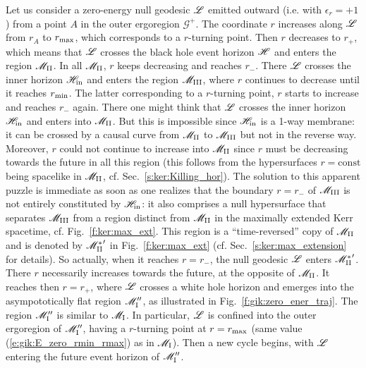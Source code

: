 Let us consider a zero-energy null geodesic $\mathscr{L}$ emitted outward (i.e.
with $\epsilon_r = +1$) from a point $A$ in the outer ergoregion $\mathscr{G}^+$.
The coordinate $r$ increases along $\mathscr{L}$ from $r_A$ to $r_{\rm max}$, which
corresponds to a $r$-turning point. Then $r$ decreases to $r_+$, which means
that $\mathscr{L}$
crosses the black hole event horizon $\mathscr{H}$ and enters the region $\mathscr{M}_{\rm II}$.
In all $\mathscr{M}_{\rm II}$, $r$ keeps decreasing and reaches $r_-$. There $\mathscr{L}$
crosses the inner horizon $\mathscr{H}_{\rm in}$ and enters the region $\mathscr{M}_{\rm III}$,
where $r$ continues to decrease until it reaches $r_{\rm min}$. The latter
corresponding to a $r$-turning point, $r$ starts to increase and reaches
$r_-$ again. There one might think that $\mathscr{L}$ crosses the inner horizon
$\mathscr{H}_{\rm in}$ and enters into $\mathscr{M}_{\rm II}$. But this is impossible since
$\mathscr{H}_{\rm in}$ is a 1-way membrane: it can be crossed by a causal curve
from $\mathscr{M}_{\rm II}$ to $\mathscr{M}_{\rm III}$ but not in the reverse way. Moreover, $r$
could not continue to increase into $\mathscr{M}_{\rm II}$ since $r$ must be decreasing
towards the future in all this region (this follows from the hypersurfaces
$r=\mathrm{const}$ being spacelike in $\mathscr{M}_{\rm II}$, cf. Sec.~\ref{s:ker:Killing_hor}).
The solution to this apparent puzzle is immediate as soon as one realizes
that the boundary $r = r_-$ of $\mathscr{M}_{\rm III}$ is not entirely constituted
by $\mathscr{H}_{\rm in}$: it also comprises a null hypersurface that separates
$\mathscr{M}_{\rm III}$ from a region distinct from $\mathscr{M}_{\rm II}$ in
the maximally extended Kerr spacetime, cf. Fig.~\ref{f:ker:max_ext}. This region
is a ``time-reversed'' copy of $\mathscr{M}_{\rm II}$ and is
denoted by ${\mathscr{M}_{\rm II}^*}'$ in Fig.~\ref{f:ker:max_ext} (cf. Sec.~\ref{s:ker:max_extension}
for details).
So actually, when it reaches $r=r_-$, the null geodesic $\mathscr{L}$ enters
${\mathscr{M}_{\rm II}^*}'$. There $r$ necessarily increases towards the future, at
the opposite of $\mathscr{M}_{\rm II}$. It reaches then $r=r_+$, where $\mathscr{L}$
crosses a white hole horizon and emerges into
the asympototically flat region $\mathscr{M}_{\rm I}''$, as illustrated in
Fig.~\ref{f:gik:zero_ener_traj}. The region $\mathscr{M}_{\rm I}''$ is similar
to $\mathscr{M}_{\rm I}$. In particular, $\mathscr{L}$ is confined into the outer ergoregion
of $\mathscr{M}_{\rm I}''$, having a $r$-turning point at $r=r_{\rm max}$ (same value
(\ref{e:gik:E_zero_rmin_rmax}) as in $\mathscr{M}_{\rm I}$). Then a new cycle
begins, with $\mathscr{L}$ entering the future event horizon of $\mathscr{M}_{\rm I}''$.

